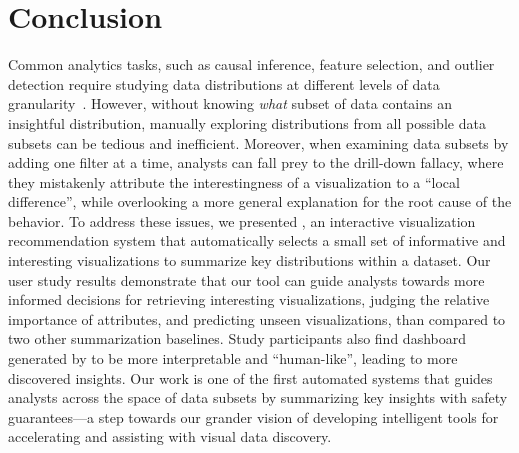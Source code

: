 \section{Conclusion}
\par Common analytics tasks, such as causal inference, feature selection, and outlier detection require studying data distributions at different levels of data granularity~\cite{Anand2015,Wu2013,Heer2012}. However, without knowing \textit{what} subset of data contains an insightful distribution, manually exploring distributions from all possible data subsets can be tedious and inefficient. Moreover, when examining data subsets by adding one filter at a time, analysts can fall prey to the drill-down fallacy, where they mistakenly attribute the interestingness of a visualization to a ``local difference'', while overlooking a more general explanation for the root cause of the behavior. To address these issues, we presented \system, an interactive visualization recommendation system that automatically selects a small set of informative and interesting visualizations to summarize key distributions within a dataset. Our user study results demonstrate that our tool can guide analysts towards more informed decisions for retrieving interesting visualizations, judging the relative importance of attributes, and predicting unseen visualizations, than compared to two other summarization baselines. Study participants also find dashboard generated by \system to be more interpretable and ``human-like'', leading to more discovered insights. Our work is one of the first automated systems that guides analysts across the space of data subsets by summarizing key insights with safety guarantees---a step towards our grander vision of developing intelligent tools for accelerating and assisting with visual data discovery.  

